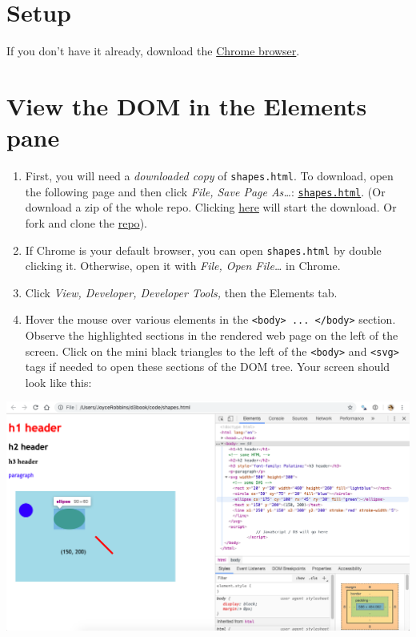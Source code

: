 \documentclass[]{book}
\begin{document}
\hypertarget{setup}{%
\section{Setup}\label{setup}}

If you don't have it already, download the \href{https://www.google.com/chrome/}{Chrome browser}.

\hypertarget{view-the-dom-in-the-elements-pane}{%
\section{View the DOM in the Elements pane}\label{view-the-dom-in-the-elements-pane}}

\begin{enumerate}
\def\labelenumi{\arabic{enumi}.}
\item
  First, you will need a \emph{downloaded copy} of \texttt{shapes.html}. To download, open the following page and then click \emph{File, Save Page As\ldots{}}: \href{https://raw.githubusercontent.com/jtr13/d3book/master/code/shapes.html}{\texttt{shapes.html}}. (Or download a zip of the whole repo. Clicking \href{https://github.com/jtr13/d3book/archive/master.zip}{here} will start the download. Or fork and clone the \href{https://github.com/jtr13/d3book}{repo}).
\item
  If Chrome is your default browser, you can open \texttt{shapes.html} by double clicking it. Otherwise, open it with \emph{File, Open File\ldots{}} in Chrome.
\item
  Click \emph{View, Developer, Developer Tools,} then the Elements tab.
\item
  Hover the mouse over various elements in the \texttt{\textless{}body\textgreater{}\ ...\ \textless{}/body\textgreater{}} section. Observe the highlighted sections in the rendered web page on the left of the screen. Click on the mini black triangles to the left of the \texttt{\textless{}body\textgreater{}} and \texttt{\textless{}svg\textgreater{}} tags if needed to open these sections of the DOM tree. Your screen should look like this:
\end{enumerate}

\begin{center}\includegraphics[width=0.8\linewidth]{images/elements} \end{center}
\end{document}

